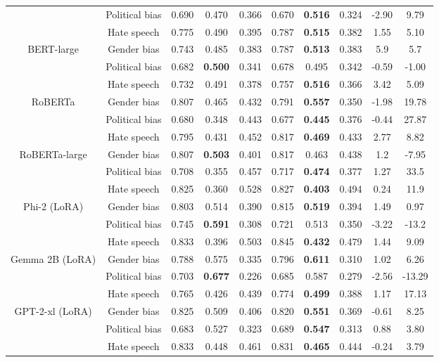 \documentclass{article}
\begin{document}
\begin{table}[ht]
\begin{tabular}{c|c|ccc|ccc|cc}
 & Political bias & 0.690 & 0.470 & 0.366 & 0.670 & \textbf{0.516} & 0.324 & -2.90 & 9.79 \\
 & Hate speech & 0.775 & 0.490 & 0.395 & 0.787 & \textbf{0.515} & 0.382 & 1.55 & 5.10 \\ \hline
\multirow{3}{*}{BERT-large} & Gender bias & 0.743 & 0.485 & 0.383 & 0.787 & \textbf{0.513} & 0.383 & 5.9 & 5.7 \\ 
 & Political bias & 0.682 & \textbf{0.500} & 0.341 & 0.678 & 0.495 & 0.342 & -0.59 & -1.00 \\
 & Hate speech & 0.732 & 0.491 & 0.378 & 0.757 & \textbf{0.516} & 0.366 & 3.42 & 5.09 \\ \hline
\multirow{3}{*}{RoBERTa} & Gender bias & 0.807 & 0.465 & 0.432 & 0.791 & \textbf{0.557} & 0.350 & -1.98 & 19.78 \\ 
 & Political bias & 0.680 & 0.348 & 0.443 & 0.677 & \textbf{0.445} & 0.376 & -0.44 & 27.87 \\ 
 & Hate speech & 0.795 & 0.431 & 0.452 & 0.817 & \textbf{0.469} & 0.433 & 2.77 & 8.82 \\ \hline
\multirow{3}{*}{RoBERTa-large} & Gender bias & 0.807 & \textbf{0.503} & 0.401 & 0.817 & 0.463 & 0.438 & 1.2 & -7.95 \\ 
 & Political bias & 0.708 & 0.355 & 0.457 & 0.717 & \textbf{0.474} & 0.377 & 1.27 & 33.5 \\ 
 & Hate speech & 0.825 & 0.360 & 0.528 & 0.827 & \textbf{0.403} & 0.494 & 0.24 & 11.9 \\ \hline

 \multirow{3}{*}{Phi-2 (LoRA)} & Gender bias & 0.803 & 0.514 & 0.390 & 0.815 & \textbf{0.519} & 0.394 & 1.49 & 0.97 \\ 
 & Political bias & 0.745 & \textbf{0.591} & 0.308 & 0.721 & 0.513 & 0.350 & -3.22 & -13.2 \\ 
 & Hate speech & 0.833 & 0.396 & 0.503 & 0.845 & \textbf{0.432} & 0.479 & 1.44 & 9.09 \\ \hline
\multirow{3}{*}{Gemma 2B (LoRA)} & Gender bias & 0.788 & 0.575 & 0.335 & 0.796 & \textbf{0.611} & 0.310 & 1.02 & 6.26 \\
 & Political bias & 0.703 & \textbf{0.677} & 0.226 & 0.685 & 0.587 & 0.279 & -2.56 & -13.29 \\ 
 & Hate speech & 0.765 & 0.426 & 0.439 & 0.774 & \textbf{0.499} & 0.388 & 1.17 & 17.13 \\ \hline
\multirow{3}{*}{GPT-2-xl (LoRA)} & Gender bias & 0.825 & 0.509 & 0.406 & 0.820 & \textbf{0.551} & 0.369 & -0.61 & 8.25 \\ 
 & Political bias & 0.683 & 0.527 & 0.323 & 0.689 & \textbf{0.547} & 0.313 & 0.88 & 3.80 \\ 
 & Hate speech & 0.833 & 0.448 & 0.461 & 0.831 & \textbf{0.465} & 0.444 & -0.24 & 3.79 \\ \hline
\end{tabular}
\label{table:comparison}
\end{table}
\end{document}
